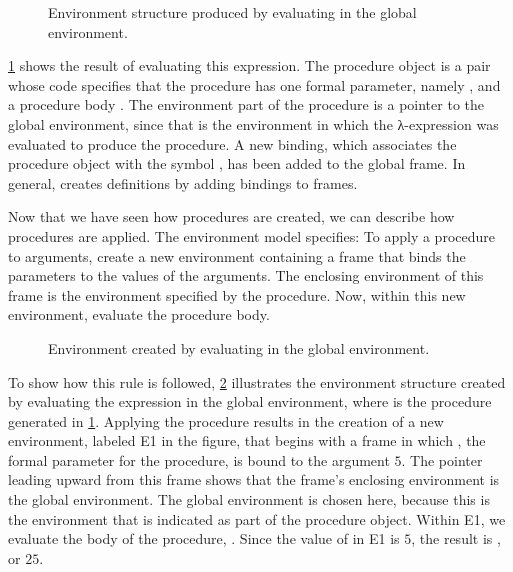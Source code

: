 \begin{figure}[tb]
	\centering
	
	\caption{
		Environment structure produced by evaluating  in the global environment.
	}
	\label{Figure 3.2}
\end{figure}

\cref{Figure 3.2} shows the result of evaluating this  expression.
The procedure object is a pair whose code specifies that the procedure has one formal parameter, namely , and a procedure body .
The environment part of the procedure is a pointer to the global environment, since that is the environment in which the λ-expression was evaluated to produce the procedure.
A new binding, which associates the procedure object with the symbol , has been added to the global frame.
In general,  creates definitions by adding bindings to frames.

Now that we have seen how procedures are created, we can describe how procedures are applied.
The environment model specifies:
To apply a procedure to arguments, create a new environment containing a frame that binds the parameters to the values of the arguments.
The enclosing environment of this frame is the environment specified by the procedure.
Now, within this new environment, evaluate the procedure body.

\begin{figure}[tb]
	\centering
	
	\caption{
		Environment created by evaluating  in the global environment.
	}
	\label{Figure 3.3}
\end{figure}

To show how this rule is followed, \cref{Figure 3.3} illustrates the environment structure created by evaluating the expression  in the global environment, where  is the procedure generated in \cref{Figure 3.2}.
Applying the procedure results in the creation of a new environment, labeled E1 in the figure, that begins with a frame in which , the formal parameter for the procedure, is bound to the argument \( 5 \).
The pointer leading upward from this frame shows that the frame’s enclosing environment is the global environment.
The global environment is chosen here, because this is the environment that is indicated as part of the  procedure object.
Within E1, we evaluate the body of the procedure, .
Since the value of  in E1 is \( 5 \), the result is , or \( 25 \).

